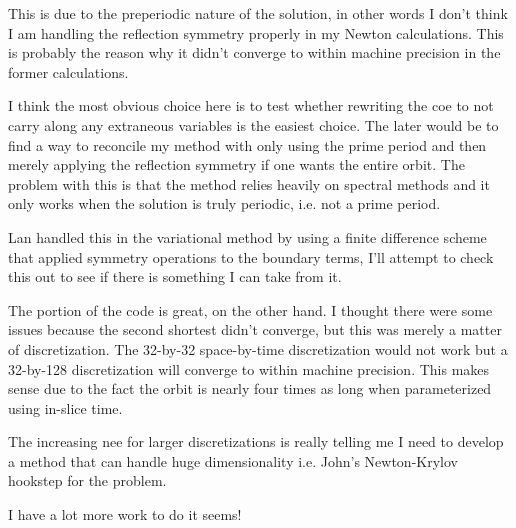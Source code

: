 \begin{description}
{This is due to the preperiodic nature of the solution,
in other words I don't think I am handling the reflection symmetry properly
in my Newton calculations. This is probably the reason why it didn't converge
to within machine precision in the former calculations.

I think the most obvious choice here is to test whether rewriting the coe
to not carry along any extraneous variables is the easiest choice. The later
would be to find a way to reconcile my method with only using the prime
period and then merely applying the reflection symmetry if one wants the
entire orbit. The problem with this is that the method relies heavily
on spectral methods and it only works when the solution is truly periodic,
i.e. not a prime period.

Lan handled this in the variational method by using a finite difference
scheme that applied symmetry operations to the boundary terms,
I'll attempt to check this out to see if there is something I can take from it.

The {\rpo} portion of the code is great, on the other hand. I thought there were
some issues because the second shortest {\rpo} didn't converge, but this was
merely a matter of discretization. The 32-by-32 space-by-time discretization
would not work but a 32-by-128 discretization will converge to within
machine precision. This makes sense due to the fact the orbit is nearly four times
as long when parameterized using in-slice time.

The increasing nee for larger discretizations is really telling me I need to develop
a method that can handle huge dimensionality i.e. John's Newton-Krylov hookstep for
the problem.

I have a lot more work to do it seems!

}

\end{description}
